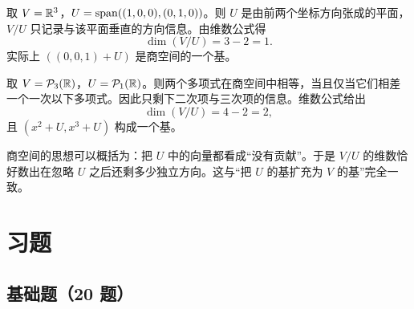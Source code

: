 \begin{example} 取 $V=\mathbb{R}^3$，$U=\operatorname{span}((1,0,0),(0,1,0))$。则 $U$ 是由前两个坐标方向张成的平面，$V/U$ 只记录与该平面垂直的方向信息。由维数公式得
\[ \dim(V/U)=3-2=1. \]
实际上 $((0,0,1)+U)$ 是商空间的一个基。
\end{example}

\begin{example} 取 $V=\mathcal{P}_3(\mathbb{R})$，$U=\mathcal{P}_1(\mathbb{R})$。则两个多项式在商空间中相等，当且仅当它们相差一个一次以下多项式。因此只剩下二次项与三次项的信息。维数公式给出
\[ \dim(V/U)=4-2=2, \]
且 $(x^2+U,x^3+U)$ 构成一个基。
\end{example}

\begin{remark} 商空间的思想可以概括为：把 $U$ 中的向量都看成“没有贡献”。于是 $V/U$ 的维数恰好数出在忽略 $U$ 之后还剩多少独立方向。这与“把 $U$ 的基扩充为 $V$ 的基”完全一致。
\end{remark}

\section*{习题}

\subsection*{基础题（20 题）}

